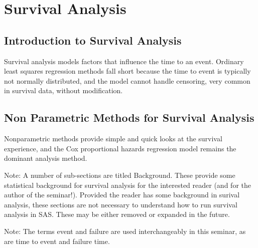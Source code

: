 \documentclass[]{article}
\title{}
\author{}
\begin{document}
\section*{Survival Analysis}
	
\subsection*{Introduction to Survival Analysis}

Survival analysis models factors that influence the time to an event. Ordinary least squares regression methods fall short because the time to event is typically not normally distributed, and the model cannot handle censoring, very common in survival data, without modification. 

\subsection*{Non Parametric Methods for Survival Analysis}
Nonparametric methods provide simple and quick looks at the survival experience, and the Cox proportional hazards regression model remains the dominant analysis method. 



Note: A number of sub-sections are titled Background. These provide some statistical background for survival analysis for the interested reader (and for the author of the seminar!). Provided the reader has some background in surival analysis, these sections are not necessary to understand how to run survival analysis in SAS. These may be either removed or expanded in the future.

Note: The terms event and failure are used interchangeably in this seminar, as are time to event and failure time.



\end{document}
